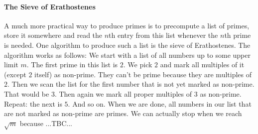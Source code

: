 

\paragraph{The Sieve of Erathostenes}
A much more practical way to produce primes is to precompute a list of primes, store it somewhere and read the $n$th entry from this list whenever the $n$th prime is needed. One algorithm to produce such a list is the sieve of Erathostenes. The algorithm works as follows: We start with a list of all numbers up to some upper limit $m$. The first prime in this list is $2$. We pick $2$ and mark all multiples of it (except $2$ itself) as non-prime. They can't be prime because they are multiples of $2$. Then we scan the list for the first number that is not yet marked as non-prime. That would be $3$. Then again we  mark all proper multiples of $3$ as non-prime. Repeat: the next is $5$. And so on. When we are done, all numbers in our list that are not marked as non-prime are primes. We can actually stop when we reach $\sqrt{m}$ because ...TBC...



